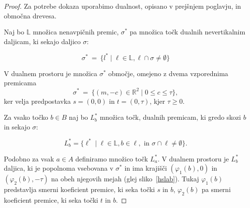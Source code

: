 \documentclass[a4paper, 12pt]{book}
\newcommand{\LL}{\ensuremath{\mathbb L}}
\newcommand{\RR}{\ensuremath{\mathbb R}}  %
\begin{document}
\begin{proof}
Za potrebe dokaza uporabimo dualnost, opisano v prejšnjem poglavju, in območna drevesa.

Naj bo $\LL$ množica nenavpičnih premic, $\sigma^*$ pa množica točk dualnih nevertikalnim daljicam, ki sekajo daljico $\sigma$:

\[
		\sigma^* ~=~ \{ l^* \mid \ell\in \LL, \ell\cap \sigma\neq \emptyset\} 
\]

V dualnem prostoru je množica $\sigma^*$ območje, omejeno z dvema vzporednima premicama
\[
		\sigma^* ~=~ \{ (m,-c)\in \RR^2\mid 0\le c\le \tau\},
\]
ker velja predpostavka $s=(0,0)$ in $t=(0,\tau)$, kjer $\tau\ge 0$.


Za vsako točko $b\in B$ naj bo $L^* _b$ množica točk, dualnih premicam, ki gredo skozi $b$ in sekajo $\sigma$:

\[
		L^*_b=\{ \ell^* \mid \ell\in \LL, b \in \ell, \text{ in } \sigma\cap \ell\not= \emptyset\}.
	\]

Podobno za vsak $a\in A$ definiramo množico točk $L^* _a$. V dualnem prostoru je $L^* _b$ daljica, ki je popolnoma vsebovana v $\sigma^*$ in ima krajišči $(\varphi_1(b),0)$ in $(\varphi_2(b),-\tau)$ na obeh njegovih mejah (glej sliko~\ref{hslab}). Tukaj $\varphi_1(b)$ predstavlja smerni koeficient premice, ki seka točki $s$ in $b$, $\varphi_2(b)$ pa smerni koeficient premice, ki seka točki $t$ in $b$.


\end{proof}
\end{document}
